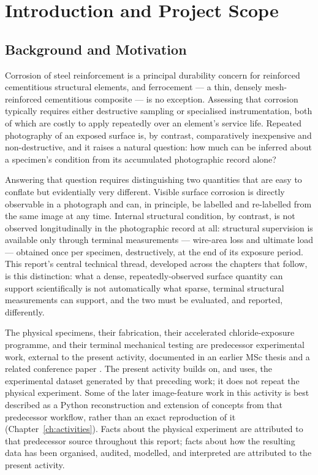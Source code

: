 \chapter{Introduction and Project Scope}
\label{ch:introduction}

\section{Background and Motivation}
\label{sec:intro-background}

Corrosion of steel reinforcement is a principal durability concern for
reinforced cementitious structural elements, and ferrocement — a thin,
densely mesh-reinforced cementitious composite — is no exception. Assessing
that corrosion typically requires either destructive sampling or
specialised instrumentation, both of which are costly to apply repeatedly
over an element's service life. Repeated photography of an exposed
surface is, by contrast, comparatively inexpensive and non-destructive,
and it raises a natural question: how much can be inferred about a
specimen's condition from its accumulated photographic record alone?

Answering that question requires distinguishing two quantities that are
easy to conflate but evidentially very different. Visible surface
corrosion is directly observable in a photograph and can, in principle, be
labelled and re-labelled from the same image at any time. Internal
structural condition, by contrast, is not observed longitudinally in the
photographic record at all: structural supervision is available only
through terminal measurements — wire-area loss and ultimate load —
obtained once per specimen, destructively, at the end of its exposure
period. This report's central technical thread, developed across the
chapters that follow, is this distinction: what a dense,
repeatedly-observed surface quantity can support scientifically is not
automatically what sparse, terminal structural measurements can support,
and the two must be evaluated, and reported, differently.

The physical specimens, their fabrication, their accelerated
chloride-exposure programme, and their terminal mechanical testing are
predecessor experimental work, external to the present activity,
documented in an earlier MSc thesis \citep{hossain_thesis} and a related
conference paper \citep{artiste2025}. The present activity builds on, and
uses, the experimental dataset generated by that preceding work; it does
not repeat the physical experiment. Some of the later image-feature work
in this activity is best described as a Python reconstruction and
extension of concepts from that predecessor workflow, rather than an
exact reproduction of it (Chapter~\ref{ch:activities}). Facts about the physical experiment are
attributed to that predecessor source throughout this report; facts about
how the resulting data has been organised, audited, modelled, and
interpreted are attributed to the present activity.

